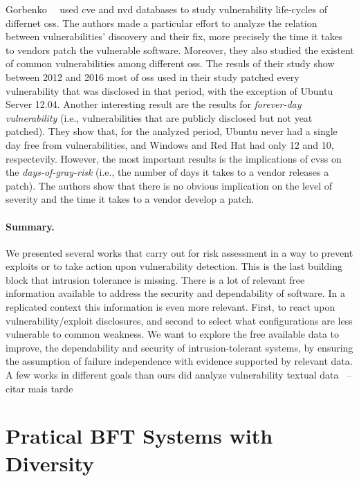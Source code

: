 

Gorbenko~\etal{}~\cite{Gorbenko:2017} used \gls{cve} and \gls{nvd} databases to study vulnerability life-cycles of differnet \glspl{os}.
The authors made a particular effort to analyze the relation between vulnerabilities' discovery and their fix, more precisely the time it takes to vendors patch the vulnerable software.
Moreover, they also studied the existent of common vulnerabilities among different \glspl{os}.
The resuls of their study show between 2012 and 2016 most of \glspl{os} used in their study patched every vulnerability that was disclosed in that period, with the exception of Ubuntu Server 12.04.
Another interesting result are the results for \emph{forever-day vulnerability} (i.e., vulnerabilities that are publicly disclosed but not yeat patched). 
They show that, for the analyzed period, Ubuntu never had a single day free from vulnerabilities, and Windows and Red Hat had  only 12 and 10, respectevily.
However, the most important results is the implications of \gls{cvss} on the \emph{days-of-gray-risk} (i.e., the number of days it takes to a vendor releases a patch). 
The authors show that there is no obvious implication on the level of severity and the time it takes to a vendor develop a patch.


\paragraph{Summary.} We presented several works that carry out for risk assessment in a way to prevent exploits or to take action upon vulnerability detection. 
This is the last building block that intrusion tolerance is missing. 
There is a lot of relevant free information available to address the security and dependability of software. 
In a replicated context this information is even more relevant. 
First, to react upon vulnerability/exploit disclosures, and second to select what configurations are less vulnerable to common weakness. 
We want to explore the free available data to improve, the dependability and security of intrusion-tolerant systems, by ensuring the assumption of failure independence with evidence supported by  relevant data.
A few works in different goals than ours did analyze vulnerability textual data~\cite{Joshi:2013} -- citar mais tarde



\section{Pratical BFT Systems with Diversity}



